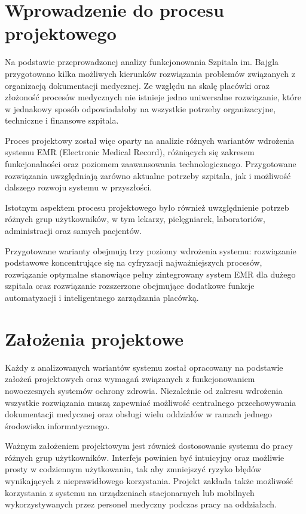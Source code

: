 \label{chapter:project-idea}

\setlength{\parskip}{0pt}
\setlength{\parindent}{1.25cm}

\section{Wprowadzenie do procesu projektowego}
Na podstawie przeprowadzonej analizy funkcjonowania Szpitala im. Bajgla przygotowano kilka możliwych kierunków rozwiązania problemów związanych z organizacją dokumentacji medycznej. Ze względu na skalę placówki oraz złożoność procesów medycznych nie istnieje jedno uniwersalne rozwiązanie, które w jednakowy sposób odpowiadałoby na wszystkie potrzeby organizacyjne, techniczne i finansowe szpitala.

Proces projektowy został więc oparty na analizie różnych wariantów wdrożenia systemu EMR (Electronic Medical Record), różniących się zakresem funkcjonalności oraz poziomem zaawansowania technologicznego. Przygotowane rozwiązania uwzględniają zarówno aktualne potrzeby szpitala, jak i możliwość dalszego rozwoju systemu w przyszłości.

Istotnym aspektem procesu projektowego było również uwzględnienie potrzeb różnych grup użytkowników, w tym lekarzy, pielęgniarek, laboratoriów, administracji oraz samych pacjentów.

Przygotowane warianty obejmują trzy poziomy wdrożenia systemu: rozwiązanie podstawowe koncentrujące się na cyfryzacji najważniejszych procesów, rozwiązanie optymalne stanowiące pełny zintegrowany system EMR dla dużego szpitala oraz rozwiązanie rozszerzone obejmujące dodatkowe funkcje automatyzacji i inteligentnego zarządzania placówką.


\section{Założenia projektowe}
Każdy z analizowanych wariantów systemu został opracowany na podstawie założeń projektowych oraz wymagań związanych z funkcjonowaniem nowoczesnych systemów ochrony zdrowia. Niezależnie od zakresu wdrożenia wszystkie rozwiązania muszą zapewniać możliwość centralnego przechowywania dokumentacji medycznej oraz obsługi wielu oddziałów w ramach jednego środowiska informatycznego.

Ważnym założeniem projektowym jest również dostosowanie systemu do pracy różnych grup użytkowników. Interfejs powinien być intuicyjny oraz możliwie prosty w codziennym użytkowaniu, tak aby zmniejszyć ryzyko błędów wynikających z nieprawidłowego korzystania. Projekt zakłada także możliwość korzystania z systemu na urządzeniach stacjonarnych lub mobilnych wykorzystywanych przez personel medyczny podczas pracy na oddziałach.

